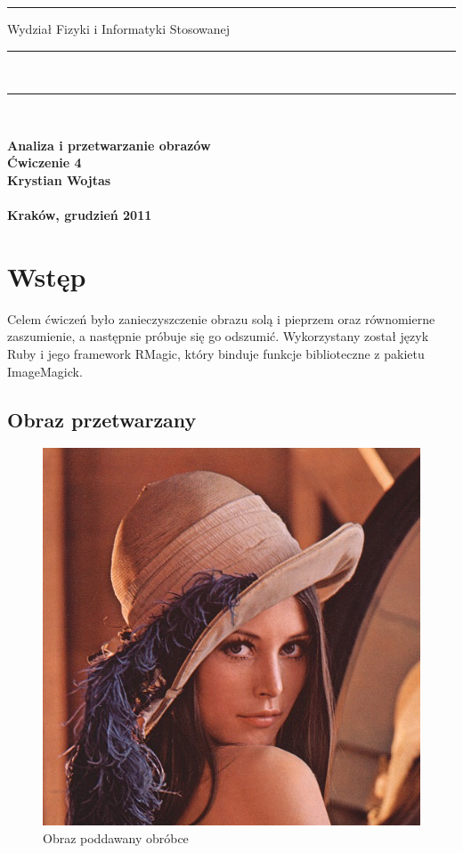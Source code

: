 \documentclass[a4paper,12pt]{article}
\begin{document}
\rule{26mm}{0pt}
{\large\textsf{Wydział Fizyki i Informatyki Stosowanej}}\\
\rule{\textwidth}{3pt}\\
\rule[2ex]
{\textwidth}{1pt}\\
\vspace{7ex}
\begin{center}
{\bf\LARGE\textsf{Analiza i przetwarzanie obrazów}}\\
\vspace{13ex}
{\bf\huge\textsf{Ćwiczenie 4}}\\
\vspace{3ex}
{\sf \small } {\bf\small\textsf{Krystian Wojtas}}\\
\vspace{14ex}
{\sf \Large } {\bf\Large\textsf{}}\\
\vspace{22ex}
\textsf{\bf\large\textsf{Kraków, grudzień 2011}}
\end{center}


\newpage
\section{Wstęp}
Celem ćwiczeń było zanieczyszczenie obrazu solą i pieprzem oraz równomierne zaszumienie, a następnie próbuje się go odszumić. Wykorzystany został język Ruby i jego framework RMagic, który binduje funkcje biblioteczne z pakietu ImageMagick.

\subsection{Obraz przetwarzany}
\begin{figure}[h!]
   \centering
   \includegraphics[width=15cm]{../../lena.jpg}
   \caption{Obraz poddawany obróbce}
\end{figure}
\end{document}
